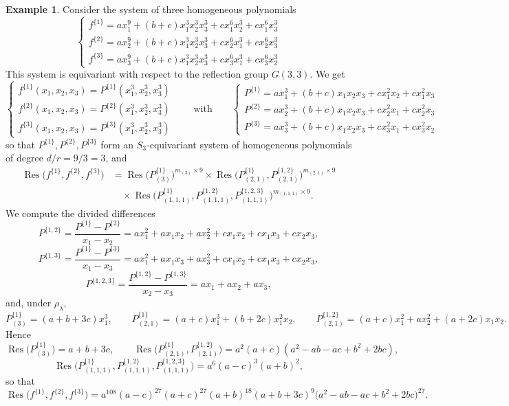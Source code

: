 \documentclass[12pt]{amsart}
\theoremstyle{definition}
\newtheorem{example}[theorem]{Example}
\newcommand{\Res}{\operatorname{Res}}
\begin{document}
\begin{example}
\label{ex:first}
Consider the system of three homogeneous polynomials
\[
\begin{cases}
f^{\{1\}} = a x_1^9 + (b+c)x_1^3x_2^3x_3^3 + c x_1^6x_2^3 + c x_1^6x_3^3 \\
f^{\{2\}} = a x_2^9 + (b+c)x_1^3x_2^3x_3^3 + c x_2^6x_1^3 + c x_2^6x_3^3 \\
f^{\{3\}} = a x_3^9 + (b+c)x_1^3x_2^3x_3^3 + c x_3^6x_1^3 + c x_3^6x_2^3
\end{cases}
\]
This system is equivariant with respect to the reflection group $G(3,3)$. We get
\[
\begin{cases}
f^{\{1\}}(x_1,x_2,x_3) = P^{\{1\}}(x_1^3,x_2^3,x_3^3) \\
f^{\{2\}}(x_1,x_2,x_3) = P^{\{2\}}(x_1^3,x_2^3,x_3^3) \\
f^{\{3\}}(x_1,x_2,x_3) = P^{\{3\}}(x_1^3,x_2^3,x_3^3)
\end{cases}
\qquad\text{with}\qquad
\begin{cases}
P^{\{1\}} = ax_1^3 + (b+c)x_1x_2x_3 + cx_1^2x_2 + cx_1^2x_3 \\
P^{\{2\}} = ax_2^3 + (b+c)x_1x_2x_3 + cx_2^2x_1 + cx_2^2x_3 \\
P^{\{3\}} = ax_3^3 + (b+c)x_1x_2x_3 + cx_3^2x_1 + cx_3^2x_2
\end{cases}
\]
so that $P^{\{1\}},P^{\{2\}},P^{\{3\}}$ form an $S_3$-equivariant system of homogeneous polynomials of degree $d/r = 9/3 = 3$, and
\begin{align*}
\Res\big(f^{\{1\}},f^{\{2\}},f^{\{3\}}\big) &= \Res\big(P^{\{1\}}_{(3)}\big)^{m_{(3)}\times 9} \times \Res\big(P^{\{1\}}_{(2,1)},P^{\{1,2\}}_{(2,1)}\big)^{m_{(2,1)}\times 9} \\
&\quad \times \Res\big(P^{\{1\}}_{(1,1,1)},P^{\{1,2\}}_{(1,1,1)},P^{\{1,2,3\}}_{(1,1,1)}\big)^{m_{(1,1,1)}\times 9}.
\end{align*}
We compute the divided differences
\[
P^{\{1,2\}} = \frac{P^{\{1\}}-P^{\{2\}}}{x_1-x_2} = ax_1^2 + ax_1x_2 + ax_2^2 + cx_1x_2 + cx_1x_3 + cx_2x_3,
\]
\[
P^{\{1,3\}} = \frac{P^{\{1\}}-P^{\{3\}}}{x_1-x_3} = ax_1^2 + ax_1x_3 + ax_3^2 + cx_1x_2 + cx_1x_3 + cx_2x_3,
\]
\[
P^{\{1,2,3\}} = \frac{P^{\{1,2\}}-P^{\{1,3\}}}{x_2-x_3} = ax_1+ax_2+ax_3,
\]
and, under $\rho_\lambda$,
\[
P^{\{1\}}_{(3)} = (a+b+3c)x_1^3, \qquad P^{\{1\}}_{(2,1)} = (a+c)x_1^3 + (b+2c)x_1^2x_2, \qquad P^{\{1,2\}}_{(2,1)} = (a+c)x_1^2 + ax_2^2 + (a+2c)x_1x_2.
\]
Hence
\[
\Res\big(P^{\{1\}}_{(3)}\big) = a+b+3c, \qquad \Res\big(P^{\{1\}}_{(2,1)}, P^{\{1,2\}}_{(2,1)}\big) = a^2(a+c)(a^2-ab-ac+b^2+2bc),
\]
\[
\Res\big(P^{\{1\}}_{(1,1,1)},P^{\{1,2\}}_{(1,1,1)},P^{\{1,2,3\}}_{(1,1,1)}\big) = a^6(a-c)^3(a+b)^2,
\]
so that
\[
\Res\big(f^{\{1\}},f^{\{2\}},f^{\{3\}}\big) = a^{108}(a-c)^{27}(a+c)^{27}(a+b)^{18}(a+b+3c)^9\big(a^2-ab-ac+b^2+2bc\big)^{27}.
\]
\end{example}
\end{document}
